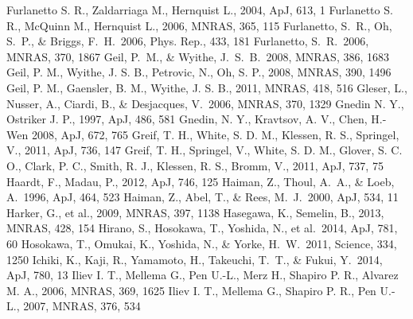 \begin{thebibliography}{99}
\begin{multicols}{2}
{ Furlanetto S. R., Zaldarriaga M., Hernquist L., 2004, ApJ, 613, 1
 Furlanetto S. R., McQuinn M., Hernquist L., 2006, MNRAS, 365, 115
 Furlanetto, S.~R., Oh, S.~P., \& Briggs, F.~H.\ 2006, Phys. Rep., 433, 181 
 Furlanetto, S.~R.\ 2006, MNRAS, 370, 1867
 Geil, P.~M., \& Wyithe, J.~S.~B.\ 2008, MNRAS, 386, 1683 
 Geil, P. M., Wyithe, J. S. B., Petrovic, N., Oh, S. P., 2008, MNRAS, 390, 1496
 Geil, P. M., Gaensler, B. M., Wyithe, J. S. B., 2011, MNRAS, 418, 516
 Gleser, L., Nusser, A., Ciardi, B., \& Desjacques, V.\ 2006, MNRAS, 370, 1329 
 Gnedin N. Y., Ostriker J. P., 1997, ApJ, 486, 581
 Gnedin, N. Y., Kravtsov, A. V., Chen, H.-Wen 2008, ApJ, 672, 765
 Greif, T. H., White, S. D. M., Klessen, R. S., Springel, V., 2011, ApJ, 736, 147
 Greif, T. H., Springel, V., White, S. D. M., Glover, S. C. O., Clark, P. C., Smith, R. J., Klessen, R. S., Bromm, V., 2011, ApJ, 737, 75
 Haardt, F., Madau, P., 2012, ApJ, 746, 125
 Haiman, Z., Thoul, A.~A., \& Loeb, A.\ 1996, ApJ, 464, 523 
 Haiman, Z., Abel, T., \& Rees, M.~J.\ 2000, ApJ, 534, 11
 Harker, G., et al., 2009, MNRAS, 397, 1138
  Hasegawa, K., Semelin, B., 2013, MNRAS, 428, 154
 Hirano, S., Hosokawa, T., Yoshida, N., et al.\ 2014, ApJ, 781, 60 
 Hosokawa, T., Omukai, K., Yoshida, N., \& Yorke, H.~W.\ 2011, Science, 334, 1250 
 Ichiki, K., Kaji, R., Yamamoto, H., Takeuchi, T.~T., \& Fukui, Y.\ 2014, ApJ, 780, 13 
 Iliev I. T., Mellema G., Pen U.-L., Merz H., Shapiro P. R., Alvarez M. A., 2006, MNRAS, 369, 1625
 Iliev I. T., Mellema G., Shapiro P. R., Pen U.-L., 2007, MNRAS, 376, 534
}
\end{multicols}
\end{thebibliography}
